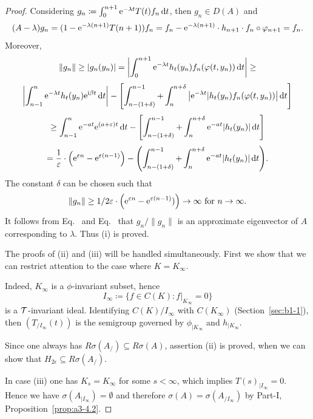 \begin{proof}
	Considering $g_{n}\coloneq \int_{0}^{n+1} \mathrm{e}^{-\lambda t} T(t)f_{n} \mathop{}\!\mathrm{d}{t}$, then $g_{n} \in D(A)$ and
	\begin{equation}\label{eq:b3-4.7}
		(A - \lambda)g_{n} = (1 - \eu^{-\lambda(n+1)}T(n+1))f_{n} = f_{n} - \eu^{-\lambda(n+1)} \cdot h_{n+1} \cdot f_{n} \circ \phi_{n+1} = f_{n}.
	\end{equation}
	Moreover,
	\[\|g_{n}\| \geq |g_{n}(y_{n})| = \left|\int_{0}^{n+1} \eu^{-\lambda t} h_{t}(y_{n})f_{n}(\phi(t,y_{n})) \dt \right| \geq\]
	\[\left|\int_{n-1}^{n} \eu^{-\lambda t} h_{t}(y_{n}) \eu^{\im\beta  t} \dt\right| - \left[\int_{n-(1+\delta)}^{n-1} + \int_{n}^{n+\delta}\left| \eu^{-\lambda t}|h_{t}(y_{n})f_{n}(\phi(t,y_{n}))\right| \dt\right]\]
	\[\geq \int_{n-1}^{n} \eu^{-at} \eu^{(a+\epsilon)t} \dt - \left[\int_{n-(1+\delta)}^{n-1} + \int_{n}^{n+\delta} \eu^{-at}|h_{t}(y_{n})| \dt\right]\]
	\[
    = \frac{1}{\epsilon}\cdot\left(\eu^{\epsilon n} - \eu^{\epsilon(n-1)}\right) - \mleft(\int_{n-(1+\delta)}^{n-1} + \int_{n}^{n+\delta} \eu^{-at}|h_{t}(y_{n})| \dt\mright) .
    \]
	The constant $\delta$ can be chosen such that
	\begin{equation}\label{eq:b3-4.8}
		\|g_{n}\| \geq 1/2\epsilon \cdot\left(\eu^{\epsilon n} - \eu^{\epsilon(n-1)})\right) \to \infty \text{ for } n \to \infty.
	\end{equation}
	It follows from Eq.~ and Eq.~ that $ g_n / \|g_n\|$ is an approximate
	eigenvector of\/ $A$ corresponding to $\lambda$. 
    Thus (i) is proved. 
	
	The 
	proofs of (ii) and (iii) will be handled simultaneously. 
    First we show that we can restrict attention to the case where $K = K_\infty$.
	
	Indeed, $K_{\infty}$ is a $\phi$-invariant subset, hence \[
    I_{\infty}\coloneq \{f \in C(K) \colon f|_{K_{\infty}} = 0\}
    \]
    is a $\mathcal{T}$-invariant ideal.
	Identifying $C(K)/I_{\infty}$ with $C(K_{\infty})$ (\cf Section~\ref{sec:b1-1}), then $(T_{/I_{\infty}}(t))$ is the semigroup governed by $\phi_{|K_{\infty}}$ and $h_{|K_{\infty}}$.
    
	Since one always has $R{\sigma}(A_{/}) \subseteq R{\sigma}(A)$, assertion (ii) is proved, 
	when we can show that $H_{2\epsilon} \subseteq R{\sigma}(A_{/})$.
    
	In case (iii) one has $K_{s} = K_{\infty}$ for some $s < \infty$, which implies $T(s)_{|I_{\infty}} = 0$.
	Hence we have $\sigma(A_{|I_{\infty}}) = \emptyset$ and therefore $\sigma(A) = \sigma(A_{/I_{\infty}})$ by Part-I, Proposition~\ref{prop:a3-4.2}.
	

\end{proof}
